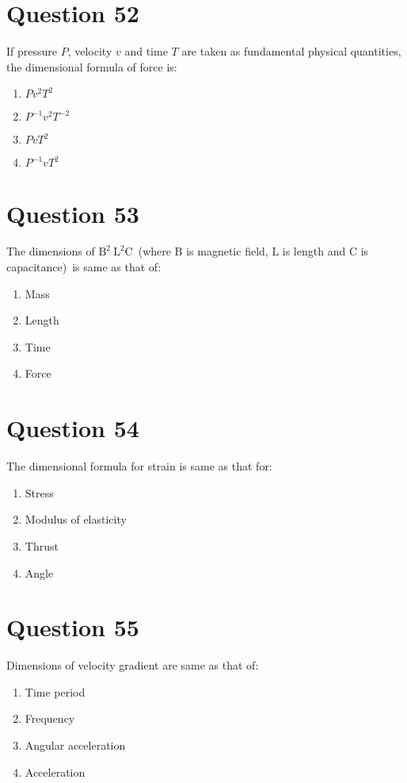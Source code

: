 \documentclass{article}
\begin{document}
\section*{Question 52}
If pressure \(P\), velocity \(v\) and time \(T\) are taken as fundamental physical quantities, the dimensional formula of force is:
\begin{enumerate}[label=(\alph*)]
\item \(P v^2 T^2\)
\item \(P^{-1} v^2 T^{-2}\)
\item \(P v T^2\)
\item \(P^{-1} v T^2\)
\end{enumerate}
\newpage
\section*{Question 53}
The dimensions of \(\mathrm{B}^2 \mathrm{~L}^2 \mathrm{C}\) (where \(\mathrm{B}\) is magnetic field, \(\mathrm{L}\) is length and \(\mathrm{C}\) is capacitance) is same as that of:
\begin{enumerate}[label=(\alph*)]
\item Mass
\item Length
\item Time
\item Force
\end{enumerate}
\newpage
\section*{Question 54}
The dimensional formula for strain is same as that for:
\begin{enumerate}[label=(\alph*)]
\item Stress
\item Modulus of elasticity
\item Thrust
\item Angle
\end{enumerate}
\newpage
\section*{Question 55}
Dimensions of velocity gradient are same as that of:\newline
\begin{enumerate}[label=(\alph*)]
\item Time period
\item Frequency
\item Angular acceleration
\item Acceleration
\end{enumerate}
\newpage
\end{document}

